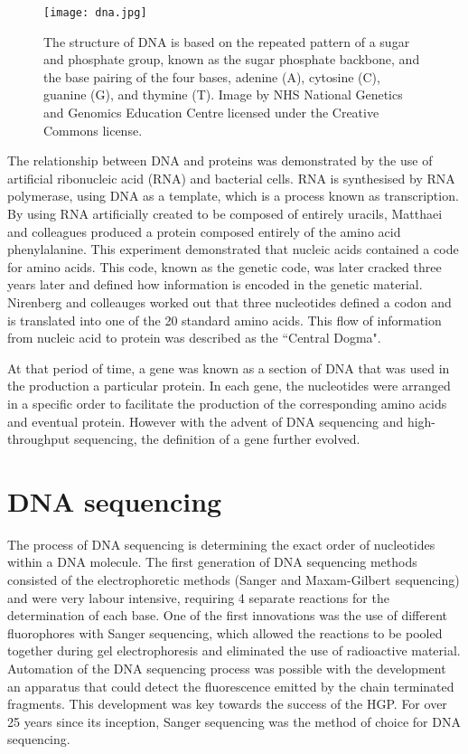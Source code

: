 \begin{figure}[h]
   \centering
   \texttt{[image: dna.jpg]}
   \caption[The structure of DNA]{The structure of DNA is based on the repeated pattern of a sugar and phosphate group, known as the sugar phosphate backbone, and the base pairing of the four bases, adenine (A), cytosine (C), guanine (G), and thymine (T). Image by NHS National Genetics and Genomics Education Centre licensed under the Creative Commons license.}
   \label{fig:dna}
\end{figure}

The relationship between DNA and proteins was demonstrated by the use of artificial ribonucleic acid (RNA) and bacterial cells\cite{pmid14471390}. RNA is synthesised by RNA polymerase, using DNA as a template, which is a process known as transcription. By using RNA artificially created to be composed of entirely uracils, Matthaei and colleagues produced a protein composed entirely of the amino acid phenylalanine. This experiment demonstrated that nucleic acids contained a code for amino acids. This code, known as the genetic code, was later cracked three years later\cite{pmid5330357} and defined how information is encoded in the genetic material. Nirenberg and colleauges worked out that three nucleotides defined a codon and is translated into one of the 20 standard amino acids. This flow of information from nucleic acid to protein was described as the ``Central Dogma"\cite{crick1958protein}.

At that period of time, a gene was known as a section of DNA that was used in the production a particular protein. In each gene, the nucleotides were arranged in a specific order to facilitate the production of the corresponding amino acids and eventual protein. However with the advent of DNA sequencing and high-throughput sequencing, the definition of a gene further evolved.

\section{DNA sequencing}

The process of DNA sequencing is determining the exact order of nucleotides within a DNA molecule. The first generation of DNA sequencing methods consisted of the electrophoretic methods (Sanger and Maxam-Gilbert sequencing) and were very labour intensive, requiring 4 separate reactions for the determination of each base. One of the first innovations was the use of different fluorophores with Sanger sequencing, which allowed the reactions to be pooled together during gel electrophoresis and eliminated the use of radioactive material. Automation of the DNA sequencing process was possible with the development an apparatus that could detect the fluorescence emitted by the chain terminated fragments. This development was key towards the success of the HGP. For over 25 years since its inception, Sanger sequencing was the method of choice for DNA sequencing.

